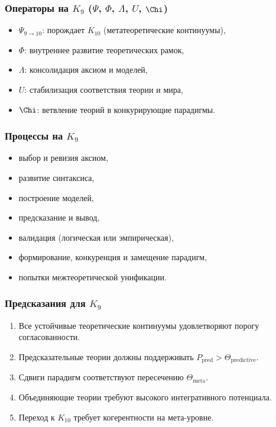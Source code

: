 \subsubsection{Операторы на \texorpdfstring{$K_9$}{K_9} (\texorpdfstring{$\Psi$}{\Psi}, \texorpdfstring{$\Phi$}{\Phi}, \texorpdfstring{$\Lambda$}{\Lambda}, \texorpdfstring{$U$}{U}, \texorpdfstring{$\Chi$}{\Chi})}

\begin{itemize}
    \item $\Psi_{9\to10}$: порождает $K_{10}$ (метатеоретические континуумы),
    \item $\Phi$: внутреннее развитие теоретических рамок,
    \item $\Lambda$: консолидация аксиом и моделей,
    \item $U$: стабилизация соответствия теории и мира,
    \item $\Chi$: ветвление теорий в конкурирующие парадигмы.
\end{itemize}

\subsubsection{Процессы на \texorpdfstring{$K_9$}{K_9}}

\begin{itemize}
    \item выбор и ревизия аксиом,
    \item развитие синтаксиса,
    \item построение моделей,
    \item предсказание и вывод,
    \item валидация (логическая или эмпирическая),
    \item формирование, конкуренция и замещение парадигм,
    \item попытки межтеоретической унификации.
\end{itemize}

\subsubsection{Предсказания для \texorpdfstring{$K_9$}{K_9}}

\begin{enumerate}
    \item Все устойчивые теоретические континуумы удовлетворяют порогу согласованности.
    \item Предсказательные теории должны поддерживать $P_{\mathrm{pred}} > \Theta_{\mathrm{predictive}}$.
    \item Сдвиги парадигм соответствуют пересечению $\Theta_{\mathrm{meta}}$.
    \item Объединяющие теории требуют высокого интегративного потенциала.
    \item Переход к $K_{10}$ требует когерентности на мета-уровне.
\end{enumerate}

